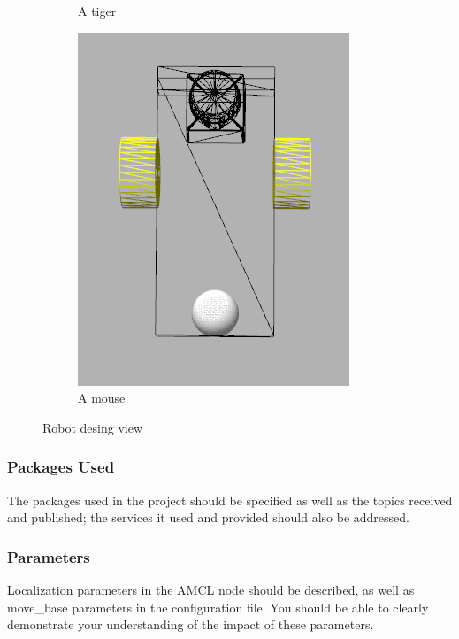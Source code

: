 \documentclass[10pt,journal,compsoc]{IEEEtran}
\begin{document}
\begin{figure}
\begin{subfigure}[b]{0.3\textwidth}
        \caption{A tiger}
        \label{fig:tiger}
    \end{subfigure}
    \begin{subfigure}[b]{0.3\textwidth}
        \includegraphics[width=\textwidth]{robokoko-design-3}
        \caption{A mouse}
        \label{fig:mouse}
    \end{subfigure}
    \caption{Robot desing view}\label{fig:animals}
\end{figure}


\subsubsection{Packages Used}
The packages used in the project should be specified as well as the topics received and published; the services it used and provided should also be addressed. 

\subsubsection{Parameters}
Localization parameters in the AMCL node should be described, as well as move\_base parameters in the configuration file. You should be able to clearly demonstrate your understanding of the impact of these parameters.
\end{document}

